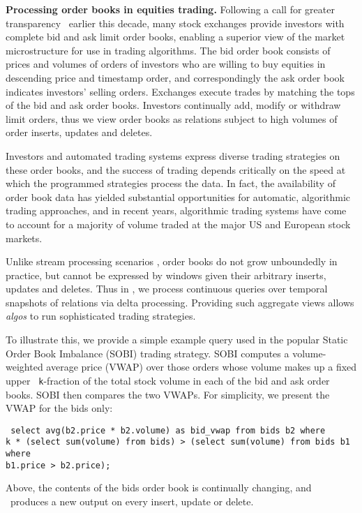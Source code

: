 \medskip


\textbf{Processing order books in equities trading.}  Following a call for
greater transparency~\cite{sec-orderbook:00} earlier this decade, many stock
exchanges provide investors with complete bid and ask limit order books,
enabling a superior view of the market microstructure for use in trading
algorithms. The bid order book consists of prices and volumes of orders of
investors who are willing to buy equities in descending price and timestamp
order, and correspondingly the ask order book indicates investors' selling
orders. Exchanges execute trades by matching the tops of the bid and ask order
books. Investors continually add, modify or withdraw limit orders, thus we view
order books as relations subject to high volumes of order inserts, updates and
deletes.

Investors and automated trading systems express diverse trading strategies on
these order books, and the success of trading depends critically on the speed at
which the programmed strategies process the data.  In fact, the availability of
order book data has yielded substantial opportunities for automatic, algorithmic
trading approaches, and in recent years, algorithmic trading systems have come
to account for a majority of volume traded at the major US and European stock
markets.

Unlike stream processing scenarios \cite{abadi-vldbj:03,motwani-cidr:03}, order
books do not grow unboundedly in practice, but cannot be expressed by windows
given their arbitrary inserts, updates and deletes. Thus in \compiler, we
process continuous queries over temporal snapshots of relations via delta
processing.  Providing such aggregate views allows {\em algos}\/ to run
sophisticated trading strategies. 

To illustrate this, we provide a simple example query used in the popular Static
Order Book Imbalance (SOBI) trading strategy. SOBI computes a volume-weighted
average price (VWAP) over those orders whose volume makes up a fixed upper {\tt
k}-fraction of the total stock volume in each of the bid and ask order
books. SOBI then compares the two VWAPs. For simplicity, we present the VWAP for
the bids only:

\begin{verbatim} select avg(b2.price * b2.volume) as bid_vwap from bids b2 where
k * (select sum(volume) from bids) > (select sum(volume) from bids b1 where
b1.price > b2.price);
\end{verbatim} %
%
Above, the contents of the bids order book is continually changing, and
\compiler\ produces a new output on every insert, update or delete.



